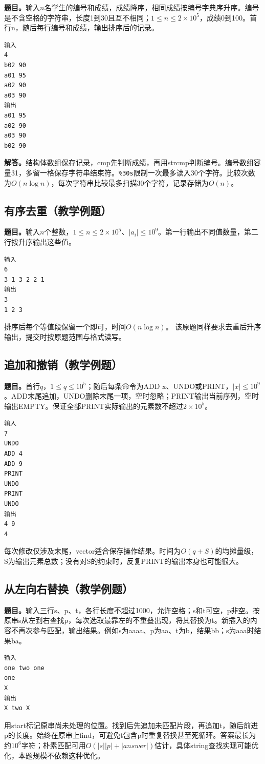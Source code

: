\noindent\textbf{题目。}输入$n$名学生的编号和成绩，成绩降序，相同成绩按编号字典序升序。编号是不含空格的字符串，长度1到30且互不相同；$1\le n\le2\times10^5$，成绩0到100。首行n，随后每行编号和成绩，输出排序后的记录。
\begin{verbatim}
输入
4
b02 90
a01 95
a02 90
a03 90
输出
a01 95
a02 90
a03 90
b02 90
\end{verbatim}

\noindent\textbf{解答。}结构体数组保存记录，cmp先判断成绩，再用strcmp判断编号。编号数组容量31，多留一格保存字符串结束符。\texttt{\%30s}限制一次最多读入30个字符。比较次数为$O(n\log n)$，每次字符串比较最多扫描30个字符，记录存储为$O(n)$。
\subsection{有序去重（教学例题）}

\noindent\textbf{题目。}输入$n$个整数，$1\le n\le2\times10^5$、$|a_i|\le10^9$。第一行输出不同值数量，第二行按升序输出这些值。
\begin{verbatim}
输入
6
3 1 3 2 2 1
输出
3
1 2 3
\end{verbatim}
排序后每个等值段保留一个即可，时间$O(n\log n)$。
该原题同样要求去重后升序输出，提交时按原题范围与格式读写。
\subsection{追加和撤销（教学例题）}

\noindent\textbf{题目。}首行$q$，$1\le q\le10^5$；随后每条命令为ADD x、UNDO或PRINT，$|x|\le10^9$。ADD末尾追加，UNDO删除末尾一项，空时忽略；PRINT输出当前序列，空时输出EMPTY。保证全部PRINT实际输出的元素数不超过$2\times10^5$。
\begin{verbatim}
输入
7
UNDO
ADD 4
ADD 9
PRINT
UNDO
PRINT
UNDO
输出
4 9
4
\end{verbatim}
每次修改仅涉及末尾，vector适合保存操作结果。时间为$O(q+S)$的均摊量级，S为输出元素总数；没有对S的约束时，反复PRINT的输出本身也可能很大。
\subsection{从左向右替换（教学例题）}

\noindent\textbf{题目。}输入三行s、p、t，各行长度不超过1000，允许空格；s和t可空，p非空。按原串s从左到右查找p，每次选取最靠左的不重叠出现，将其替换为t。新插入的内容不再次参与匹配，输出结果。例如s为aaaa、p为aa、t为b，结果bb；s为aaa时结果ba。
\begin{verbatim}
输入
one two one
one
X
输出
X two X
\end{verbatim}
用start标记原串尚未处理的位置。找到后先追加未匹配片段，再追加t，随后前进p的长度。始终在原串上find，可避免t包含p时重复替换甚至死循环。答案最长为约$10^6$字符；朴素匹配可用$O(|s||p|+|answer|)$估计，具体string查找实现可能优化，本题规模不依赖这种优化。
